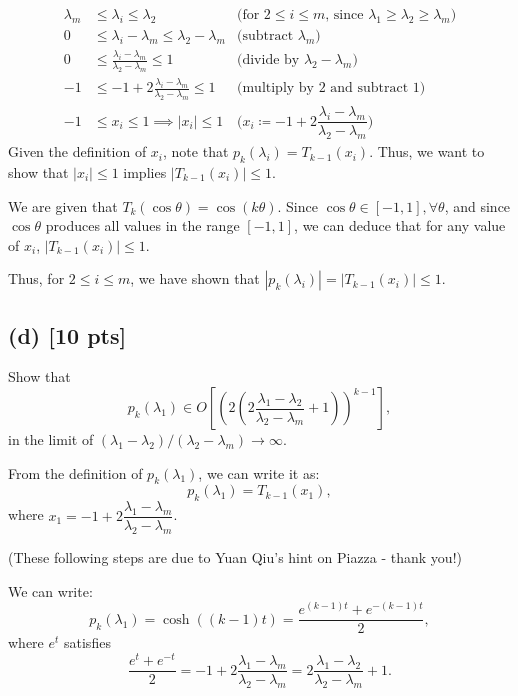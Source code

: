 \documentclass[twoside,10pt]{article}
\begin{document}
\begin{align*}
  \lambda_m &\leq \lambda_i \leq \lambda_2&\text{(for $2 \leq i \leq m$, since $\lambda_{1} \geq \lambda_{2} \geq \lambda_{m}$)}\\
  0 &\leq \lambda_i - \lambda_m \leq \lambda_2 - \lambda_m&\text{(subtract $\lambda_m$)}\\
  0 &\leq \frac{\lambda_i - \lambda_m}{\lambda_2 - \lambda_m} \leq 1&\text{(divide by $\lambda_2 - \lambda_m$)}\\
  -1 &\leq -1 + 2 \frac{\lambda_i - \lambda_m}{\lambda_2 - \lambda_m} \leq 1 &\text{(multiply by 2 and subtract 1)}\\
  -1 &\leq x_i \leq 1 \implies |x_i| \leq 1&\text{($x_i \coloneqq - 1 + 2 \dfrac{\lambda_i - \lambda_m}{\lambda_2 - \lambda_m}$)}
\end{align*}
Given the definition of $x_i$, note that $p_k(\lambda_i) = T_{k - 1}(x_i)$.
Thus, we want to show that $|x_i| \leq 1$ implies $|T_{k - 1}(x_i)| \leq 1$.

We are given that $T_k\left(\cos \theta\right) = \cos\left(k \theta \right)$.
Since $\cos \theta \in [-1, 1], \forall \theta$, and since $\cos \theta$ produces all values in the range $[-1, 1]$, we can deduce that for any value of $x_i$, $|T_{k - 1}(x_i)| \leq 1$.

Thus, for $2 \leq i \leq m$, we have shown that $|p_k(\lambda_i)| = |T_{k - 1}(x_i)| \leq 1$.

\subsection*{(d) [10 pts]}
Show that
\begin{equation}
  p_k(\lambda_1) \in O\left[ \left(2 \left(2 \frac{\lambda_1 - \lambda_2}{\lambda_2 - \lambda_m} + 1\right)\right)^{k - 1} \right],
\end{equation}
in the limit of $(\lambda_{1} - \lambda_{2}) / (\lambda_{2} - \lambda_{m}) \rightarrow \infty$. 

\hbox{}

\quad From the definition of $p_k(\lambda_1)$, we can write it as:
$$p_k(\lambda_1) = T_{k - 1}(x_1),$$
where $x_1 = -1 + 2\dfrac{\lambda_1 - \lambda_m}{\lambda_2 - \lambda_m}$.

(These following steps are due to Yuan Qiu's hint on Piazza - thank you!)

We can write:
$$p_k(\lambda_1) = \cosh((k-1)t) = \dfrac{e^{(k-1)t} + e^{-(k-1)t}}{2},$$
where $e^t$ satisfies
$$\dfrac{e^t + e^{-t}}{2} = -1 + 2\dfrac{\lambda_1 - \lambda_m}{\lambda_2 - \lambda_m} = 2\dfrac{\lambda_1 - \lambda_2}{\lambda_2 - \lambda_m} + 1.$$
\end{document}
